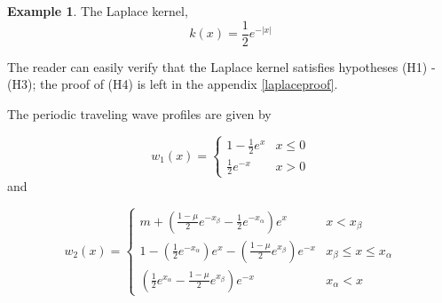 \documentclass[11pt]{article}
\theoremstyle{definition}
\newtheorem{ex}[thm]{Example}
\numberwithin{equation}{section}
\numberwithin{thm}{section}
\renewcommand{\a}{\alpha}
\renewcommand{\b}{\beta}
\newcommand{\m}{\mu}
\begin{document}
\begin{ex}
The Laplace kernel,
\begin{equation}\label{laplacekernel}
k(x) = \frac{1}{2} e^{-|x|}
\end{equation}

The reader can easily verify that the Laplace kernel satisfies hypotheses (H1) - (H3); the proof of (H4) is left in the appendix \ref{laplaceproof}.

The periodic traveling wave profiles are given by

\begin{equation} \label{w1laplace}
w_1(x) =   \begin{cases} 
1 - \frac{1}{2}e^{x} & x \leq 0 \\
\frac{1}{2}e^{-x} & x > 0
\end{cases}
\end{equation}
and

\begin{equation} \label{w2laplace}
w_2(x) = \begin{cases}
m + \left( \frac{1-\m}{2}e^{-x_\b} - \frac{1}{2}e^{-x_\a} \right) e^x & x < x_\b \\
1 - \left( \frac{1}{2} e^{-x_\a} \right) e^x - \left( \frac{1-\m}{2} e^{x_\b} \right)  e^{-x} & x_\b \leq x \leq x_\a \\
\left( \frac{1}{2} e^{x_\a} - \frac{1-\m}{2} e^{x_\b} \right) e^{-x} & x_\a < x 
\end{cases} \end{equation}


\end{ex}
\end{document}
